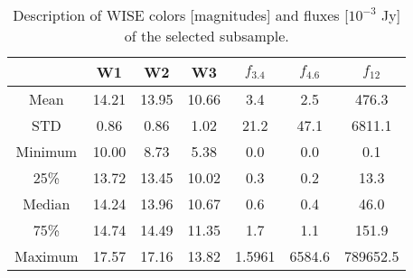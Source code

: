 \begin{table}[h]
	\centering
	\begin{tabular}{ccccccc}
\toprule \toprule
{} &       W1 &       W2 &       W3 &   $f_{3.4}$ &   $f_{4.6}$ &    $f_{12}$ \\
\midrule
Mean  &    14.21 &    13.95 &    10.66 &   3.4 &     2.5 &     476.3 \\
STD   &     0.86 &     0.86 &     1.02 &   21.2 &     47.1 &     6811.1 \\
Minimum   &    10.00 &     8.73 &     5.38 &    0.0 &     0.0 &     0.1 \\
25\%   &    13.72 &    13.45 &    10.02 &   0.3 &     0.2 &     13.3 \\
Median   &    14.24 &    13.96 &    10.67 &   0.6 &     0.4 &     46.0 \\
75\%   &    14.74 &    14.49 &    11.35 &   1.7 &     1.1 &     151.9 \\
Maximum   &    17.57 &    17.16 &    13.82 & 1.5961 &     6584.6 &   789652.5 \\
\bottomrule
\end{tabular}
\caption{Description of WISE colors [magnitudes] and fluxes [$10^{-3}$ Jy] of the selected subsample.}
\label{tab:wise_subsample_describe}
\end{table}